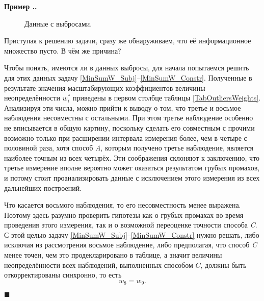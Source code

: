 \documentclass[a5paper,openany]{book}
\newcounter{ExmpNum}[section]
\renewcommand{\theExmpNum}{\thesection.\arabic{ExmpNum}}
\newenvironment{example}%
  {\refstepcounter{ExmpNum}%
  \par\addvspace{\medskipamount} 
  \noindent\textbf{Пример {\theExmpNum}.}
  }%
  {\hfill$\blacksquare$\par\medskip}
\begin{document}
\begin{example}
  
\begin{figure}[ht]
\centering 

\caption{Данные с выбросами.}
\label{DataWithOutliers}  
\end{figure}
  
  
Приступая к решению задачи, сразу же обнаруживаем, что её информационное множество 
пусто. В чём же причина? 
  
Чтобы понять, имеются ли в данных выбросы, для начала попытаемся решить для этих данных 
задачу \eqref{MinSumW_Subj}--\eqref{MinSumW_Constr}. Полученные в результате значения 
масштабирующих коэффициентов величины неопределённости $w_i^*$  приведены в первом 
столбце таблицы \ref{TabOutliersWeights}. Анализируя эти числа, можно прийти к выводу 
о том, что третье и восьмое наблюдения несовместны с остальными. При этом третье 
наблюдение особенно не вписывается в общую картину, поскольку сделать его совместным 
с прочими возможно только при расширении интервала измерения более, чем в четыре 
с половиной раза, хотя способ \textit{A}, которым получено третье наблюдение, является 
наиболее точным из всех четырёх. Эти соображения склоняют к заключению, что третье 
измерение вполне вероятно может оказаться результатом грубых промахов, и потому 
стоит проанализировать данные с исключением этого измерения из всех дальнейших 
построений. 
  
Что касается восьмого наблюдения, то его несовместность менее выражена. Поэтому здесь 
разумно проверить гипотезы как о грубых промахах во время проведения этого измерения, 
так и о возможной переоценке точности способа \textit{C}. С этой целью задачу 
\eqref{MinSumW_Subj}--\eqref{MinSumW_Constr} нужно решать, либо исключая из рассмотрения 
восьмое наблюдение, либо предполагая, что способ \textit{C} менее точен, чем это 
продекларировано в таблице, а значит величины неопределённости всех наблюдений, 
выполненных способом $C$, должны быть откорректированы синхронно, то есть 
\begin{equation}
w_{8} = w_{9}.
\label{W8equalsW9}
\end{equation}
  

\end{example}
\end{document}
